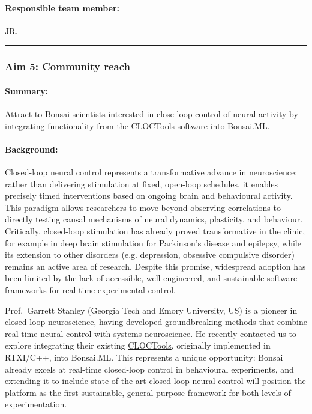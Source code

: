 \paragraph{Responsible team member:} JR.

\noindent\rule{\textwidth}{1pt}
\subsubsection{Aim 5: Community reach}

\paragraph{Summary:} Attract to Bonsai scientists interested in close-loop
control of neural activity by integrating functionality from
the \href{https://cloctools.github.io/}{CLOCTools} software into Bonsai.ML.

\paragraph{Background:} Closed-loop neural control represents a transformative
advance in neuroscience:  rather than delivering stimulation at fixed,
open-loop schedules, it enables precisely timed interventions based on ongoing
brain and behavioural activity. This paradigm allows researchers to move beyond
observing correlations to  directly testing causal mechanisms of neural
dynamics, plasticity, and behaviour. Critically, closed-loop stimulation has
already proved transformative in the  clinic, for example in deep brain
stimulation for Parkinson’s disease and  epilepsy, while its extension to other
disorders (e.g. depression, obsessive  compulsive disorder) remains an active
area of research. Despite this promise, widespread adoption has been limited
by the lack of accessible, well-engineered,  and sustainable software
frameworks for real-time experimental control.

Prof.~Garrett Stanley (Georgia Tech and Emory University, US) is a pioneer in
closed-loop neuroscience, having developed groundbreaking methods that combine
real-time neural control with systems neuroscience. He recently contacted us to
explore integrating their existing
\href{https://cloctools.github.io/}{CLOCTools}, originally implemented in
RTXI/C++, into Bonsai.ML.  This represents a unique opportunity: Bonsai already
excels at real-time closed-loop control in behavioural experiments, and
extending it to include state-of-the-art closed-loop neural control will
position the platform as the first sustainable, general-purpose framework for
both levels of experimentation.

